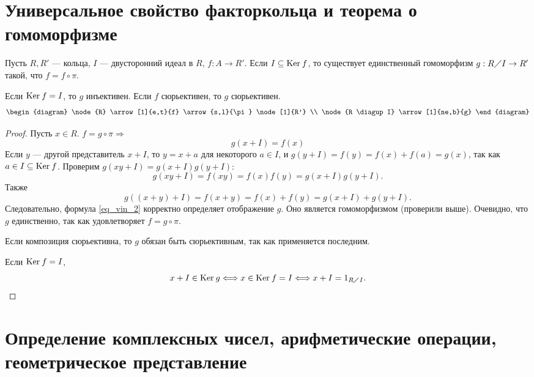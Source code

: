 \documentclass[11pt]{book}
\newcommand{\po}{\diagup}
\renewcommand{\ker}{{\mathop{\text{\rm Ker}}}\:}
\theoremstyle{definition}
\theoremstyle{plain}
\theoremstyle{plain}
\theoremstyle{definition}
\theoremstyle{remark}
\begin{document}
\section{Универсальное свойство факторкольца и теорема о гомоморфизме}
\begin{thm}
    Пусть $ R, R'$ --- кольца,  $ I$ ---  двусторонний идеал в  $ R$,  $ f: A \to  R'$. Если  $ I \subseteq \ker f$, то существует единственный гомоморфизм $ g : R \po I \to  R'$ такой, что $ f = f \circ \pi$.

    Если $ \ker f = I$, то  $ g$ инъективен. Если $ f$ сюрьективен, то  $ g$ сюрьективен.
    $$
    \begin{diagram}
	\node{R} \arrow[1]{e,t}{f}
	\arrow{s,l}{\pi}
	\node[1]{R'} \\
	\node{R \po I} \arrow[1]{ne,b}{g}
    \end{diagram}
    $$
\end{thm}
\begin{proof}
    Пусть $ x \in R$. $f = g \circ \pi \Longrightarrow $
    \begin{equation}\label{eq_vin_2}
	g(x + I) = f(x)
    \end{equation}
    Если $ y$ --- другой представитель  $ x + I$, то  $ y = x + a$ для некоторого  $ a \in I$, и $ g(y + I) = f(y) = f(x) + f(a) = g(x)$, так как $ a \in I \subseteq \ker f$.
    Проверим $ g(xy + I) = g(x+ I)g(y + I)$:
    \[
	g(xy + I) =  f(xy) = f(x) f(y) = g(x+I)g(y+I)
    .\]
    Также
    \[
	g((x+y) + I) = f(x+y) = f(x) + f(y) = g(x+I) +g(y+I)
    .\]
    Следовательно, формула \ref{eq_vin_2} корректно определяет отображение $ g$.
    Оно является гомоморфизмом (проверили выше).
    Очевидно, что  $ g$ единственно, так как удовлетворяет  $ f =g \circ \pi$.

    Если композиция сюрьективна, то $ g$ обязан быть сюрьективным,  так как применяется последним.

    Если  $ \ker f = I$,
    \[
	x + I \in \ker g \Longleftrightarrow x \in \ker f = I \Longleftrightarrow x + I = 1_{R \po I}
    .\]
\end{proof}
\section{Определение комплексных чисел, арифметические операции, геометрическое представление}
\end{document}
